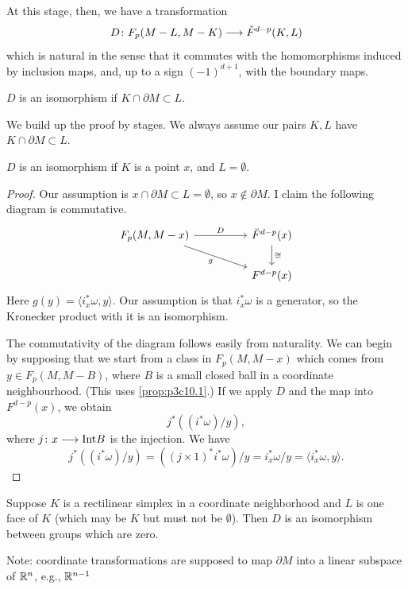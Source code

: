 \documentclass[../main]{subfiles}
\begin{document}
At this stage, then, we have a transformation
\[D \colon F_p(M-L,M-K) \longrightarrow \check{F}^{d-p}(K,L)\]
which is natural in the sense that it commutes with the homomorphisms induced by inclusion maps, and, up to a sign $(-1)^{d+1}$, with the boundary maps.
\begin{theorem}\label{thm:p3c10.6}
$D$ is an isomorphism if $K \cap \partial M \subset L$.
\end{theorem}
We build up the proof by stages. We always assume our pairs $K,L$ have $K \cap \partial M \subset L$.
\begin{remark}\label{rmk:p3c10.7}
$D$ is an isomorphism if $K$ is a point $x$, and $L = \emptyset$.
\end{remark}
\begin{proof}
Our assumption is $x \cap \partial M \subset L = \emptyset$, so $x \not\in \partial M$. I claim the following diagram is commutative.
\[
\begin{tikzcd}
{F_p(M, M - x)} \arrow[rrd, "g"'] \arrow[rr, "D"] &  & \breve F^{d - p}(x) \arrow[d, "\cong"] \\
                                                  &  & F^{d - p}(x)                          
\end{tikzcd}
\]
Here $g(y) = \langle i_x^* \omega, y \rangle$. Our assumption is that $i_x^* \omega$ is a generator, so the Kronecker product with it is an isomorphism.

The commutativity of the diagram follows easily from naturality. We can begin by supposing that we start from a class in $F_p(M,M-x)$ which comes from $y \in F_p(M,M-B)$, where $B$ is a small closed ball in a coordinate neighbourhood. (This uses \ref{prop:p3c10.1}.) If we apply $D$ and the map into $F^{d-p}(x)$, we obtain
\[j^*((i^* \omega)/y),\]
where $j \colon x \longrightarrow \mathrm{Int} B$ is the injection. We have
\[j^*((i^*\omega)/y) = ((j \times 1)^* i^* \omega)/y = i_x^*\omega/y = \langle i_x^* \omega, y \rangle.\]
\end{proof}
\begin{remark}\label{rmk:p3c10.8}
Suppose $K$ is a rectilinear simplex in a coordinate neighborhood and $L$ is one face of $K$ (which may be $K$ but must not be $\emptyset$). Then $D$ is an isomorphism between groups which are zero.
\end{remark}
Note: coordinate transformations are supposed to map $\partial M$ into a linear subspace of $\mathbb{R}^n$, e.g., $\mathbb{R}^{n-1}$
\end{document}
